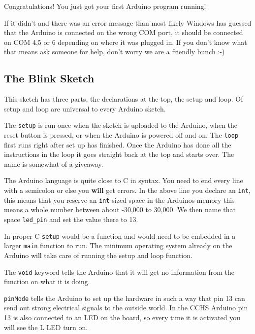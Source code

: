Congratulations!
You just got your first Arduino program running!

If it didn't and there was an error message than most likely Windows has 
guessed that the Arduino is connected on the wrong COM port,
it should be connected on COM 4,5 or 6 depending on where it was plugged in.
If you don't know what that means ask someone for help,
don't worry we are a friendly bunch :-)


\subsection{The Blink Sketch}

This sketch has three parts, 
the declarations at the top,
the setup and loop.
Of setup and loop are universal to every Arduino sketch.

The \lstinline|setup| is run once when the sketch is uploaded to the Arduino,
when the reset button is pressed, or when the Arduino is powered off and on.
The \lstinline|loop| first runs right after set up has finished.
Once the Arduino has done all the instructions in the loop
it goes straight back at the top and starts over.
The name is somewhat of a giveaway.




The Arduino language is quite close to C in syntax.
You need to end every line with a semicolon or else you \textbf{will} get errors.
In the above line you declare an \lstinline|int|,
this means that you reserve an \lstinline|int| sized space in the Arduinos memory  
this means a whole number between about -30,000 to 30,000.
We then name that space \lstinline|led_pin| and set the value there to 13.



In proper C \lstinline|setup| would be a function 
and would need to be embedded in a larger \lstinline|main| function to run.
The minimum operating system already on the Arduino will take care of running the setup and loop function.

The \lstinline|void| keyword tells the Arduino that it will get
no information from the function on what it is doing.

\lstinline|pinMode| tells the Arduino to set up the hardware in such a way that pin 13 can send out strong electrical signals to the outside world.
In the CCHS Arduino pin 13 is also connected to an LED on the board,
so every time it is activated you will see the L LED turn on.
 
